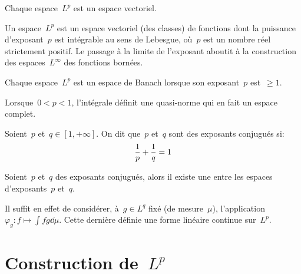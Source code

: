 \medskip
{}

\begin{theoreme}
Chaque espace~$L^p$ est un espace vectoriel.
\end{theoreme}

Un espace~$L^p$ est un espace vectoriel (des classes) de fonctions dont la puissance d'exposant~$p$ est
intégrable au sens de Lebesgue, où~$p$ est un nombre réel strictement positif.
Le passage à la limite de l'exposant aboutit à la construction des espaces~$L^\infty$ des fonctions
bornées.

\medskip
\begin{theoreme}
Chaque espace~$L^p$ est un espace de Banach lorsque son exposant~$p$ est~$\ge 1$.
\end{theoreme}

\begin{theoreme}
Lorsque~$0 < p < 1$, l'intégrale définit une quasi-norme qui en fait un espace complet.
\end{theoreme}


\medskip
\begin{definition}
Soient~$p$ et~$q\in [1,+\infty]$. On dit que~$p$ et~$q$ sont des exposants conjugués si:
\begin{equation}\colorred\dfrac1p + \dfrac1q = 1 \end{equation}
\end{definition}

\begin{theoreme}
Soient~$p$ et~$q$ des exposants conjugués, alors il existe une  entre les espaces d'exposants~$p$ et~$q$.
\end{theoreme}
Il suffit en effet de considérer, à~$g\in L^q$ fixé (de mesure~$\mu$), l'application~$\varphi_g: f\mapsto \int fg\dd\mu$. Cette dernière
définie une forme linéaire continue sur~$L^p$.

\medskip
\section{Construction de~$L^p$}

